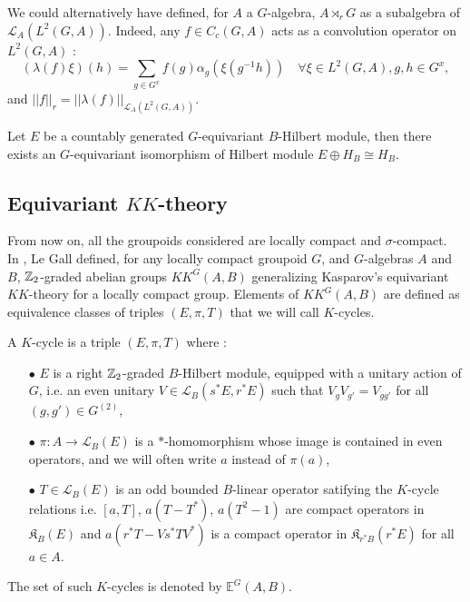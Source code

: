\begin{rk}
We could alternatively have defined, for $A$ a $G$-algebra, $A\rtimes_r G$ as a subalgebra of $\mathcal L_A(L^2(G,A))$. Indeed, any $f\in C_c(G,A)$ acts as a convolution operator on $L^2(G,A)$ :
\[(\lambda(f)\xi)(h) = \sum_{g\in G^x} f(g)\alpha_g(\xi(g^{-1} h))\quad \forall \xi\in L^2(G,A),g,h\in G^x,\]
and $||f||_{r} = ||\lambda(f)||_{\mathcal L_A (L^2(G,A))}$.
\end{rk}

\begin{lem} \label{GStabilization} Let $E$ be a countably generated $G$-equivariant $B$-Hilbert module, then there exists an $G$-equivariant isomorphism of Hilbert module $E \oplus H_B \cong H_B$.
\end{lem}

\subsection{Equivariant $KK$-theory}

From now on, all the groupoids considered are locally compact and $\sigma$-compact.\\

In \cite{LeGall}, Le Gall defined, for any locally compact groupoid $G$, and $G$-algebras $A$ and $B$, $\mathbb Z_2$-graded abelian groups $KK^G(A,B)$ generalizing Kasparov's equivariant $KK$-theory for a locally compact group. Elements of $KK^G(A,B)$ are defined as equivalence classes of triples $(E,\pi,T)$ that we will call $K$-cycles.

\begin{definition} A $K$-cycle is a triple $(E,\pi,T)$ where :
\begin{itemize}
\item[$\bullet$] $E$ is a right $\mathbb Z_2$-graded $B$-Hilbert module, equipped with a unitary action of $G$, i.e. an even unitary $V\in\mathcal L_B(s^*E,r^*E)$ such that $V_g V_{g'} = V_{gg'}$ for all $(g,g')\in G^{(2)}$,
\item[$\bullet$] $\pi : A\rightarrow \mathcal L_B(E)$ is a $*$-homomorphism whose image is contained in even operators, and we will often write $a$ instead of $\pi(a)$,
\item[$\bullet$] $T\in\mathcal L_B(E)$ is an odd bounded $B$-linear operator satifying the $K$-cycle relations i.e. $[a, T]$, $a(T-T^*)$, $a(T^2-1)$ are compact operators in $\mathfrak K_B(E)$ and $a(r^* T -V s^*T V^*)$ is a compact operator in $\mathfrak K_{r^* B}(r^* E)$ for all $a\in A$.
\end{itemize} 
The set of such $K$-cycles is denoted by $\mathbb E^G(A,B)$.
\end{definition}

